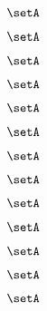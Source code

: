 \begin{forslides}
    \begin{equation}
        \label{eq:slides-processes-93}
        \setA
    \end{equation}

    \begin{equation}
        \label{eq:slides-processes-94}
        \setA
    \end{equation}

    \begin{equation}
        \label{eq:slides-processes-95}
        \setA
    \end{equation}

    \begin{equation}
        \label{eq:slides-processes-96}
        \setA
    \end{equation}

    \begin{equation}
        \label{eq:slides-processes-97}
        \setA
    \end{equation}

    \begin{equation}
        \label{eq:slides-processes-98}
        \setA
    \end{equation}

    \begin{equation}
        \label{eq:slides-processes-99}
        \setA
    \end{equation}

    \begin{equation}
        \label{eq:slides-processes-100}
        \setA
    \end{equation}

    \begin{equation}
        \label{eq:slides-processes-111}
        \setA
    \end{equation}

    \begin{equation}
        \label{eq:slides-processes-112}
        \setA
    \end{equation}

    \begin{equation}
        \label{eq:slides-processes-113}
        \setA
    \end{equation}

    \begin{equation}
        \label{eq:slides-processes-114}
        \setA
    \end{equation}

    \begin{equation}
        \label{eq:slides-processes-115}
        \setA
    \end{equation}


\end{forslides}
